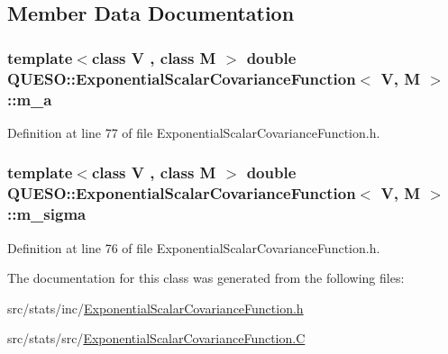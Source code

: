 \subsection{Member Data Documentation}
\hypertarget{class_q_u_e_s_o_1_1_exponential_scalar_covariance_function_a16940568b7c22abb6caf31ccfb505c16}{
\subsubsection[{m\-\_\-a}]{\setlength{\rightskip}{0pt plus 5cm}template$<$class V , class M $>$ double {\bf Q\-U\-E\-S\-O\-::\-Exponential\-Scalar\-Covariance\-Function}$<$ V, M $>$\-::m\-\_\-a\hspace{0.3cm}{\ttfamily [protected]}}}\label{class_q_u_e_s_o_1_1_exponential_scalar_covariance_function_a16940568b7c22abb6caf31ccfb505c16}


Definition at line 77 of file Exponential\-Scalar\-Covariance\-Function.\-h.

\hypertarget{class_q_u_e_s_o_1_1_exponential_scalar_covariance_function_aece243cd9fbe9bdd7720b422c2f7513a}{
\subsubsection[{m\-\_\-sigma}]{\setlength{\rightskip}{0pt plus 5cm}template$<$class V , class M $>$ double {\bf Q\-U\-E\-S\-O\-::\-Exponential\-Scalar\-Covariance\-Function}$<$ V, M $>$\-::m\-\_\-sigma\hspace{0.3cm}{\ttfamily [protected]}}}\label{class_q_u_e_s_o_1_1_exponential_scalar_covariance_function_aece243cd9fbe9bdd7720b422c2f7513a}


Definition at line 76 of file Exponential\-Scalar\-Covariance\-Function.\-h.



The documentation for this class was generated from the following files\-:\begin{DoxyCompactItemize}
\item 
src/stats/inc/\hyperlink{_exponential_scalar_covariance_function_8h}{Exponential\-Scalar\-Covariance\-Function.\-h}\item 
src/stats/src/\hyperlink{_exponential_scalar_covariance_function_8_c}{Exponential\-Scalar\-Covariance\-Function.\-C}\end{DoxyCompactItemize}
